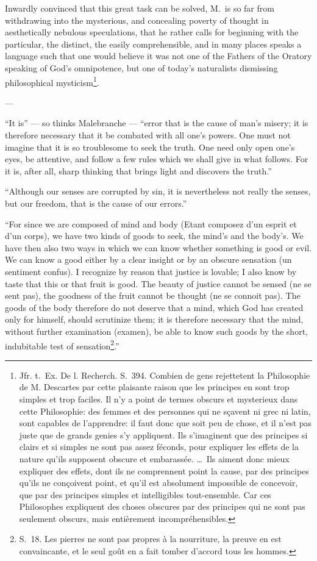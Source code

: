 \documentclass[12pt,a4paper]{article}
\begin{document}
Inwardly convinced that this great task can be solved, M.\ is so far from
withdrawing into the mysterious, and concealing poverty of thought in
aesthetically nebulous speculations, that he rather calls for beginning with the
particular, the distinct, the easily comprehensible, and in many places speaks a
language such that one would believe it was not one of the Fathers of the Oratory
speaking of God's omnipotence, but one of today's naturalists dismissing
philosophical mysticism\footnote{Jfr. t.~Ex. De l. Recherch. S.~394. Combien de
gens rejettetent la Philosophie de M. Descartes par cette plaisante raison que
les principes en sont trop simples et trop faciles. Il n'y a point de termes
obscurs et mysterieux dans cette Philosophie: des femmes et des personnes qui ne
sçavent ni grec ni latin, sont capables de l'apprendre: il faut donc que soit peu
de chose, et il n'est pas juste que de grands genies s'y appliquent. Ils
s'imaginent que des principes si clairs et si simples ne sont pas assez féconds,
pour expliquer les effets de la nature qu'ils supposent obscure et embarassée.
\dots\ Ils aiment donc mieux expliquer des effets, dont ils ne comprennent point
la cause, par des principes qu'ils ne conçoivent point, et qu'il est absolument
impossible de concevoir, que par des principes simples et intelligibles
tout-ensemble. Car ces Philosophes expliquent des choses obscures par des
principes qui ne sont pas seulement obscurs, mais entièrement
incompréhensibles.}.

\begin{center}---\end{center}

``It is'' --- so thinks Malebranche --- ``error that is the cause of man's misery;
it is therefore necessary that it be combated with all one's powers. One must not
imagine that it is so troublesome to seek the truth. One need only open one's
eyes, be attentive, and follow a few rules which we shall give in what follows.
For it is, after all, sharp thinking that brings light and discovers the truth.''

``Although our senses are corrupted by sin, it is nevertheless not really the
senses, but our freedom, that is the cause of our errors.''

``For since we are composed of mind and body (Etant composez d'un esprit et d'un
corps), we have two kinds of goods to seek, the mind's and the body's. We have
then also two ways in which we can know whether something is good or evil. We can
know a good either by a clear insight or by an obscure sensation (un sentiment
confus). I recognize by reason that justice is lovable; I also know by taste that
this or that fruit is good. The beauty of justice cannot be sensed (ne se sent
pas), the goodness of the fruit cannot be thought (ne se connoit pas). The goods
of the body therefore do not deserve that a mind, which God has created only for
himself, should scrutinize them; it is therefore necessary that the mind, without
further examination (examen), be able to know such goods by the short,
indubitable test of sensation\footnote{S.~18. Les pierres ne sont pas propres à
la nourriture, la preuve en est convaincante, et le seul goût en a fait tomber
d'accord tous les hommes.}.''
\end{document}
